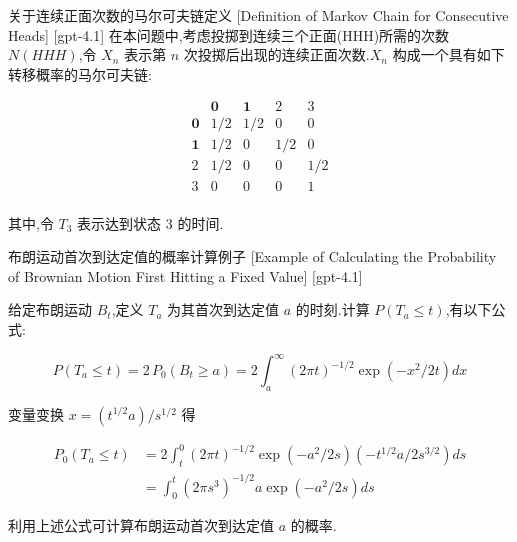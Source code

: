\documentclass[UTF8]{ctexart}
\begin{document}
    
    
    \begin{dfn}
        {关于连续正面次数的马尔可夫链定义}
        [Definition of Markov Chain for Consecutive Heads]
        [gpt-4.1]
        在本问题中,考虑投掷到连续三个正面(HHH)所需的次数 $N(HHH)$,令 $X_{n}$ 表示第 $n$ 次投掷后出现的连续正面次数.$X_{n}$ 构成一个具有如下转移概率的马尔可夫链:

\[
\begin{array}{cccc}
      & \mathbf{0} & \mathbf{1} & 2 & 3 \\
\mathbf{0} & 1/2 & 1/2 & 0 & 0 \\
\mathbf{1} & 1/2 & 0 & 1/2 & 0 \\
2 & 1/2 & 0 & 0 & 1/2 \\
3 & 0 & 0 & 0 & 1 \\
\end{array}
\]

其中,令 $T_{3}$ 表示达到状态 3 的时间.
    \end{dfn}
    
    
    
    \begin{xmp}
        {布朗运动首次到达定值的概率计算例子}
        [Example of Calculating the Probability of Brownian Motion First Hitting a Fixed Value]
        [gpt-4.1]
        
给定布朗运动 $B_t$,定义 $T_a$ 为其首次到达定值 $a$ 的时刻.计算 $P(T_a \leq t)$,有以下公式:

\[
P ( T_{a} \leq t ) = 2 \, P_{0} ( B_{t} \geq a ) = 2 \int_{a}^{\infty} (2\pi t)^{-1/2} \exp ( - x^{2} / 2t ) dx
\]

变量变换 $x = ( t^{1/2} a ) / s^{1/2}$ 得

\[
\begin{aligned}
P_{0} ( T_{a} \le t ) &= 2 \int_{t}^{0} (2\pi t)^{-1/2} \exp ( - a^{2} / 2s ) \left( - t^{1/2} a / 2 s^{3/2} \right) ds \\
&= \int_{0}^{t} (2\pi s^{3})^{-1/2} a \exp ( - a^{2} / 2s ) ds
\end{aligned}
\]

利用上述公式可计算布朗运动首次到达定值 $a$ 的概率.

    \end{xmp}
    
    
    
\end{document}

